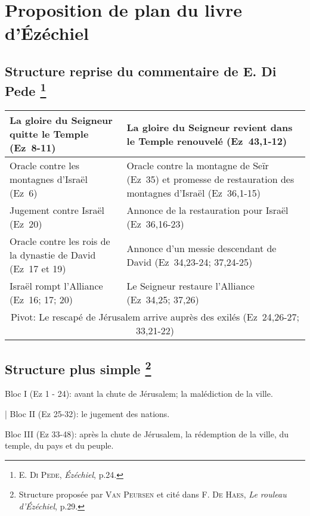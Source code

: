 \section*{Proposition de plan du livre d'Ézéchiel}
\subsection*{Structure reprise du commentaire de E. Di Pede
    \footnote{\textsc{E. Di Pede}, \textit{Ézéchiel}, p.24.}
}

\leftskip=1.5cm
\begin{tabular}{|m{7cm}|m{7cm}|}
    \hline
    La gloire du Seigneur quitte le Temple (Ez~8-11)
     & La gloire du Seigneur revient dans le Temple renouvelé (Ez~43,1-12) \tabularnewline
    \hline
    Oracle contre les montagnes d'Israël (Ez~6)
     & Oracle contre la montagne de Seïr (Ez~35) et promesse de restauration des montagnes d'Israël (Ez~36,1-15) \tabularnewline
    \hline
    Jugement contre Israël (Ez~20)
     & Annonce de la restauration pour Israël (Ez~36,16-23) \tabularnewline
    \hline
    Oracle contre les rois de la dynastie de David (Ez~17 et 19)
     & Annonce d'un messie descendant de David (Ez~34,23-24; 37,24-25) \tabularnewline
    \hline
    Israël rompt l'Alliance (Ez~16; 17; 20)
     & Le Seigneur restaure l'Alliance (Ez~34,25; 37,26) \tabularnewline
    \hline
    \multicolumn{2}{|c|}{Pivot: Le rescapé de Jérusalem arrive auprès des exilés (Ez~24,26-27; 33,21-22)} \tabularnewline
    \hline
\end{tabular}

\leftskip=0cm

\vspace{2em}
\subsection*{Structure plus simple
    \footnote{Structure proposée par \textsc{Van Peursen} et cité dans \textsc{F. De Haes}, \textit{Le rouleau d'Ézéchiel}, p.29.}
}

\leftskip=1.5cm

Bloc I (Ez 1 - 24): avant la chute de Jérusalem; la malédiction de la ville.\par
\decalage | Bloc II (Ez 25-32): le jugement des nations.\par
Bloc III (Ez 33-48): après la chute de Jérusalem, la rédemption de la ville, du temple, du pays et du peuple.

\leftskip=0cm